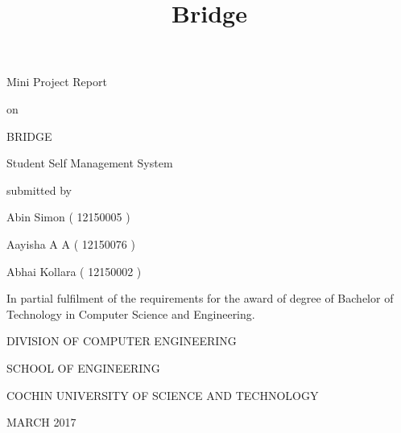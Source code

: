 \documentclass{article}
\renewcommand{\maketitle}{
\begin{center}
\LARGE
Mini Project Report

\hspace{1em}

on

\hspace{1em}

\huge
BRIDGE

\hspace{1em}
\Large
Student Self Management System

\hspace{1em}

submitted by

\hspace{1em}

\Large
Abin Simon ( 12150005 )

\Large
Aayisha A A ( 12150076 )

\Large
Abhai Kollara ( 12150002 )
\end{center}
}
\begin{document}
\title{Bridge}

\vspace*{\fill}

\maketitle

\begin{center}
\large
In partial fulfilment of the requirements for the award of degree of Bachelor of Technology in Computer Science and Engineering.

\hspace{1em}

\LARGE
DIVISION OF COMPUTER ENGINEERING

SCHOOL OF ENGINEERING

COCHIN UNIVERSITY OF SCIENCE AND TECHNOLOGY

\hspace{1em}

\large
MARCH 2017
\end{center}

\vspace*{\fill}

\newpage

\vspace*{\fill}
\end{document}
